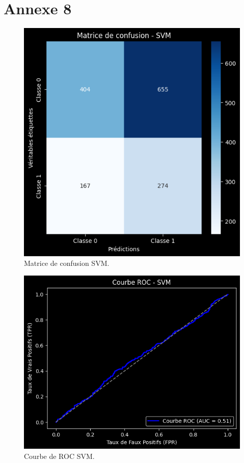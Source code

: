\section*{Annexe 8}
\label{sec:annexe8}
\begin{figure}[H]
\centering
\includegraphics[width=1\textwidth]{figures/MatriceSVM.png}
\caption{Matrice de confusion SVM.}
\label{fig:annexe8}
\end{figure}


\begin{figure}[H]
\centering
\includegraphics[width=1\textwidth]{figures/ROCSVM.png}
\caption{Courbe de ROC SVM.}
\end{figure}

